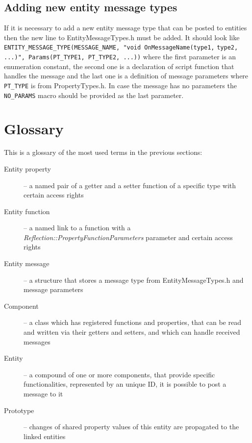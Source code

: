 \subsection{Adding new entity message types}
\label{sub:entity-newmessages}

If it is necessary to add a new entity message type that can be posted to entities then the new line to EntityMessageTypes.h must be added. It should look like \verb/ENTITY_MESSAGE_TYPE(MESSAGE_NAME, "void OnMessageName(type1,/
\verb/type2, ...)", Params(PT_TYPE1, PT_TYPE2, ...))/ where the first parameter is an enumeration constant, the second one is a declaration of script function that handles the message and the last one is a definition of message parameters where \verb/PT_TYPE/ is from PropertyTypes.h. In case the message has no parameters the \verb/NO_PARAMS/ macro should be provided as the last parameter.

\section{Glossary}

This is a glossary of the most used terms in the previous sections:

\begin{description}
  \item[Entity property] -- a named pair of a getter and a setter function of a specific type with certain access rights
  \item[Entity function] -- a named link to a function with a \emph{Reflection::Property\-FunctionParameters} parameter and certain access rights
  \item[Entity message] -- a structure that stores a message type from EntityMessageTypes.h and message parameters
  \item[Component] -- a class which has registered functions and properties, that can be read and written via their getters and setters, and which can handle received messages
  \item[Entity] -- a compound of one or more components, that provide specific functionalities, represented by an unique ID, it is possible to post a message to it
  \item[Prototype] -- changes of shared property values of this entity are propagated to the linked entities
\end{description}